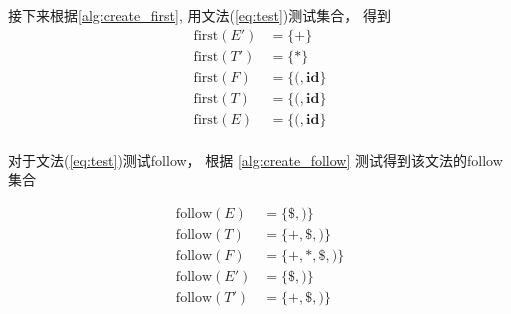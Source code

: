 \documentclass[../report]{subfiles}
\begin{document}
接下来根据\cref{alg:create_first},
用文法(\ref{eq:test})测试集合，
得到
\begin{equation}
  \begin{array}{ll}
    \mathrm{first}(E') &= \{+\} \\
    \mathrm{first}(T') &= \{*\} \\
    \mathrm{first}(F) &= \{(, \textbf{id}\} \\
    \mathrm{first}(T) &= \{(, \textbf{id}\} \\
    \mathrm{first}(E) &= \{(, \textbf{id}\} \\
  \end{array}
  \label{eq:first_ans}
\end{equation}

对于文法(\ref{eq:test})测试follow，
根据
\cref{alg:create_follow}
测试得到该文法的follow集合

\begin{equation}
  \begin{array}{ll}
  	\mathrm{follow}(E) &= \{\$, )\} \\
  	\mathrm{follow}(T) &= \{+, \$, )\} \\
  	\mathrm{follow}(F) &= \{+, *, \$, )\} \\
  	\mathrm{follow}(E') &= \{\$, )\} \\
  	\mathrm{follow}(T') &= \{+, \$, )\} \\
  \end{array}
  \label{eq:follow_ans}
\end{equation}
\end{document}
